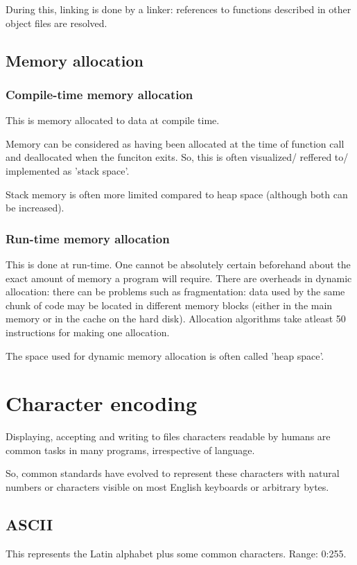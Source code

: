 \documentclass[oneside, article]{memoir}
\begin{document}
During this, linking is done by a linker: references to functions described in other object files are resolved.

\section{Memory allocation}
\subsection{Compile-time memory allocation}
This is memory allocated to data at compile time.

Memory can be considered as having been allocated at the time of function call and deallocated when the funciton exits. So, this is often visualized/ reffered to/ implemented as 'stack space'.

Stack memory is often more limited compared to heap space (although both can be increased).

\subsection{Run-time memory allocation}
This is done at run-time. One cannot be absolutely certain beforehand about the exact amount of memory a program will require. There are overheads in dynamic allocation: there can be problems such as fragmentation: data used by the same chunk of code may be located in different memory blocks (either in the main memory or in the cache on the hard disk). Allocation algorithms take atleast 50 instructions for making one allocation.

The space used for dynamic memory allocation is often called 'heap space'.

\chapter{Character encoding}
Displaying, accepting and writing to files characters readable by humans are common tasks in many programs, irrespective of language.

So, common standards have evolved to represent these characters with natural numbers or characters visible on most English keyboards or arbitrary bytes.

\section{ASCII}
This represents the Latin alphabet plus some common characters. Range: 0:255.
\end{document}
